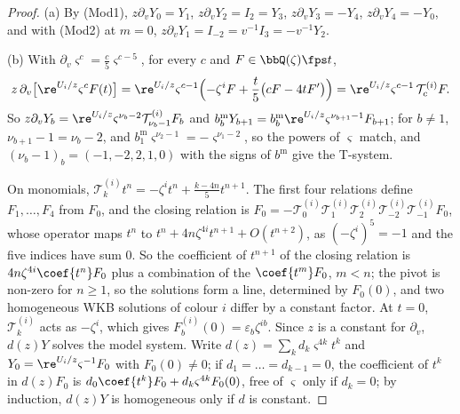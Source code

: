 \begin{proof}
(a) By (Mod1), $z\partial_vY_0=Y_1$, $z\partial_vY_2=I_2=Y_3$, $z\partial_vY_3=-Y_4$, $z\partial_vY_4=-Y_0$, and with (Mod2) at $m=0$, $z\partial_vY_1=I_{-2}=v^{-1}I_3=-v^{-1}Y_2$.

(b) With $\partial_v\varsigma^c=\frac c5\varsigma^{c-5}$, for every $c$ and $F\in\bbQ(\zeta)\fps t$,
\[
z\,\partial_v\bigl[\re^{U_i/z}\varsigma^cF(t)\bigr]=\re^{U_i/z}\varsigma^{c-1}\Bigl(-\zeta^iF+\frac t5\bigl(cF-4tF'\bigr)\Bigr)=\re^{U_i/z}\varsigma^{c-1}\,\mathcal T^{(i)}_cF .
\]
So $z\partial_vY_b=\re^{U_i/z}\varsigma^{\nu_b-2}\mathcal T^{(i)}_{\nu_b-1}F_b$ and $b^{\mathrm m}_bY_{b+1}=b^{\mathrm m}_b\re^{U_i/z}\varsigma^{\nu_{b+1}-1}F_{b+1}$; for $b\neq1$, $\nu_{b+1}-1=\nu_b-2$, and $b^{\mathrm m}_1\varsigma^{\nu_2-1}=-\varsigma^{\nu_1-2}$, so the powers of $\varsigma$ match, and $(\nu_b-1)_b=(-1,-2,2,1,0)$ with the signs of $b^{\mathrm m}$ give the T-system.

On monomials, $\mathcal T^{(i)}_kt^n=-\zeta^it^n+\frac{k-4n}5t^{n+1}$. The first four relations define $F_1,\dots,F_4$ from $F_0$, and the closing relation is $F_0=-\mathcal T^{(i)}_0\mathcal T^{(i)}_1\mathcal T^{(i)}_2\mathcal T^{(i)}_{-2}\mathcal T^{(i)}_{-1}F_0$, whose operator maps $t^n$ to $t^n+4n\zeta^{4i}t^{n+1}+O(t^{n+2})$, as $(-\zeta^i)^5=-1$ and the five indices have sum $0$. So the coefficient of $t^{n+1}$ of the closing relation is $4n\zeta^{4i}\coef{t^n}F_0$ plus a combination of the $\coef{t^m}F_0$, $m<n$; the pivot is non-zero for $n\geq1$, so the solutions form a line, determined by $F_0(0)$, and two homogeneous WKB solutions of colour $i$ differ by a constant factor. At $t=0$, $\mathcal T^{(i)}_k$ acts as $-\zeta^i$, which gives $F^{(i)}_b(0)=\varepsilon_b\zeta^{ib}$. Since $z$ is a constant for $\partial_v$, $d(z)Y$ solves the model system. Write $d(z)=\sum_kd_k\varsigma^{4k}t^k$ and $Y_0=\re^{U_i/z}\varsigma^{-1}F_0$ with $F_0(0)\neq0$; if $d_1=\dots=d_{k-1}=0$, the coefficient of $t^k$ in $d(z)F_0$ is $d_0\coef{t^k}F_0+d_k\varsigma^{4k}F_0(0)$, free of $\varsigma$ only if $d_k=0$; by induction, $d(z)Y$ is homogeneous only if $d$ is constant.
\end{proof}


